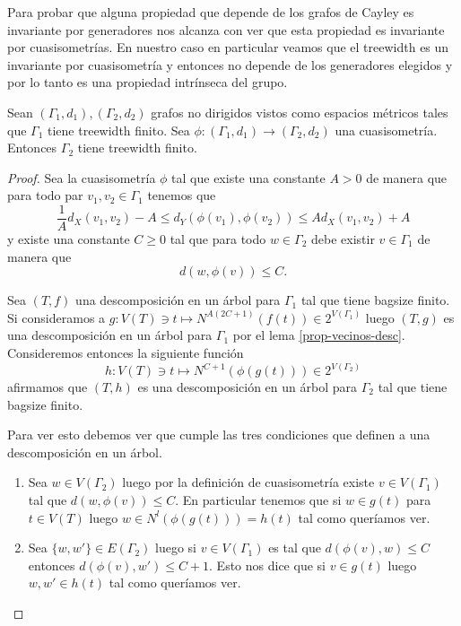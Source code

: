 \documentclass[tesis.tex]{subfiles}
\begin{document}
Para probar que alguna propiedad que depende de los grafos de Cayley es invariante por generadores nos alcanza con ver que esta propiedad es invariante por cuasisometrías.
En nuestro caso en particular veamos que el treewidth es un invariante por cuasisometría y entonces no depende de los generadores elegidos y por lo tanto es una propiedad intrínseca del grupo. 

\begin{prop} \label{treewidth-inv}
	Sean $(\Gamma_{1},d_{1}), (\Gamma_{2}, d_{2})$ grafos no dirigidos vistos como espacios métricos tales que $\Gamma_{1}$ tiene treewidth finito.
	Sea $\phi:(\Gamma_{1},d_{1})\to (\Gamma_{2},d_{2})$ una cuasisometría.
	Entonces $\Gamma_{2}$ tiene treewidth finito.
\end{prop}

\begin{proof}
	Sea la cuasisometría $\phi$ tal que existe una constante $A > 0$ de manera que para todo par $v_{1}, v_{2} \in \Gamma_{1}$ tenemos que
	\[
	\frac{1}{A} d_X(v_1,v_2) - A \le d_Y(\phi(v_1),\phi(v_2)) \le A d_X(v_1,v_2) + A
	\]
	y existe una constante $C \ge 0$ tal que para todo $w \in \Gamma_{2}$ debe existir $v \in \Gamma_{1}$ de manera que
	\[
	d(w,\phi(v)) \le C.
	\]
	
	Sea $(T,f)$ una descomposición en un árbol para $\Gamma_{1}$ tal que tiene bagsize finito.
	Si consideramos a $g: V(T) \ni t \mapsto N^{A(2C+1)}(f(t)) \in 2^{V(\Gamma_{1})}$ luego $(T,g)$ es una descomposición en un árbol para $\Gamma_{1}$ por el lema \ref{prop-vecinos-desc}.
	Consideremos entonces la siguiente función 
	\[
		h: V(T) \ni t \mapsto N^{C+1}(\phi(g(t))) \in 2^{V(\Gamma_{2})}
	\]
	afirmamos que $(T,h)$ es una descomposición en un árbol para $\Gamma_{2}$ tal que tiene bagsize finito.
	
	
	Para ver esto debemos ver que cumple las tres condiciones que definen a una descomposición en un árbol.
	\begin{enumerate}[T1.]
		\item Sea $w \in V(\Gamma_{2})$ luego por la definición de cuasisometría existe $v \in V(\Gamma_{1})$ tal que $d(w, \phi(v)) \le C$.
		En particular tenemos que si $w \in g(t)$ para $t \in V(T)$ luego  $w \in N^l(\phi(g(t))) = h(t)$ tal como queríamos ver.
		
		\item Sea $\{w,w'\} \in E(\Gamma_{2})$ luego si $v \in V(\Gamma_{1})$ es tal que $d(\phi(v),w) \le C$ entonces $d(\phi(v),w') \le C+1$.
		Esto nos dice que si $v \in g(t)$ luego $w,w' \in h(t)$ tal como queríamos ver.
		

\end{enumerate}
\end{proof}
\end{document}
